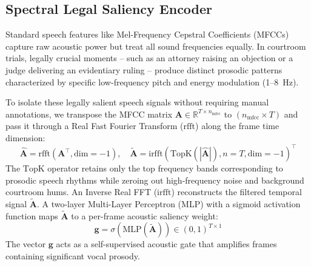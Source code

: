 \documentclass[letterpaper]{article}
\begin{document}
\subsection{Spectral Legal Saliency Encoder}

Standard speech features like Mel-Frequency Cepstral Coefficients (MFCCs) capture raw acoustic power but treat all sound frequencies equally. In courtroom trials, legally crucial moments -- such as an attorney raising an objection or a judge delivering an evidentiary ruling -- produce distinct prosodic patterns characterized by specific low-frequency pitch and energy modulation (1--8~Hz).

To isolate these legally salient speech signals without requiring manual annotations, we transpose the MFCC matrix $\mathbf{A} \in \mathbb{R}^{T \times n_{\text{mfcc}}}$ to $(n_{\text{mfcc}} \times T)$ and pass it through a Real Fast Fourier Transform ($\text{rfft}$) along the frame time dimension:
\begin{equation}
\hat{\mathbf{A}} = \text{rfft}(\mathbf{A}^\top, \text{dim}=-1), \quad
\tilde{\mathbf{A}} = \text{irfft}(\text{TopK}(|\hat{\mathbf{A}}|), n=T, \text{dim}=-1)^\top
\end{equation}
The $\text{TopK}$ operator retains only the top frequency bands corresponding to prosodic speech rhythms while zeroing out high-frequency noise and background courtroom hums. An Inverse Real FFT ($\text{irfft}$) reconstructs the filtered temporal signal $\tilde{\mathbf{A}}$. A two-layer Multi-Layer Perceptron (MLP) with a sigmoid activation function maps $\tilde{\mathbf{A}}$ to a per-frame acoustic saliency weight:
\begin{equation}
\mathbf{g} = \sigma(\text{MLP}(\tilde{\mathbf{A}})) \in (0,1)^{T \times 1}
\end{equation}
The vector $\mathbf{g}$ acts as a self-supervised acoustic gate that amplifies frames containing significant vocal prosody.
\end{document}
